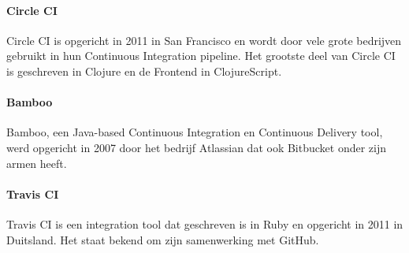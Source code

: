             
            \paragraph{Circle CI}
            Circle CI is opgericht in 2011 in San Francisco en wordt door vele grote bedrijven gebruikt in hun Continuous Integration pipeline. Het grootste deel van Circle CI is geschreven in Clojure en de Frontend in ClojureScript. 

            \paragraph{Bamboo}
            Bamboo, een Java-based Continuous Integration en Continuous Delivery tool, werd opgericht in 2007 door het bedrijf Atlassian dat ook Bitbucket onder zijn armen heeft.
            
            \paragraph{Travis CI}
            Travis CI is een integration tool dat geschreven is in Ruby en opgericht in 2011 in Duitsland. Het staat bekend om zijn samenwerking met GitHub.
            
